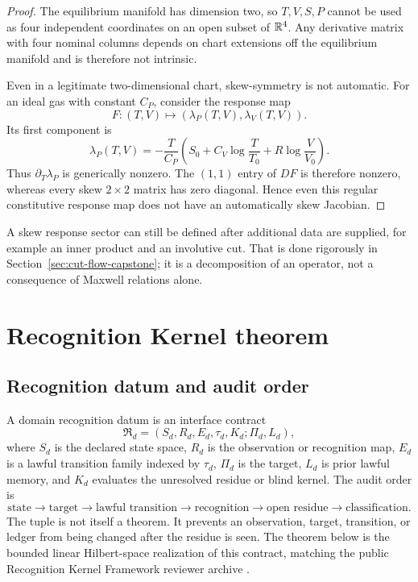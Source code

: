 \begin{proof}
The equilibrium manifold has dimension two, so $T,V,S,P$ cannot be used as four independent coordinates on an open subset of $\mathbb R^4$.  Any derivative matrix with four nominal columns depends on chart extensions off the equilibrium manifold and is therefore not intrinsic.

Even in a legitimate two-dimensional chart, skew-symmetry is not automatic.  For an ideal gas with constant $C_P$, consider the response map
\[
F:(T,V)\longmapsto(\lambda_P(T,V),\lambda_V(T,V)).
\]
Its first component is
\[
\lambda_P(T,V)=-\frac{T}{C_P}
\left(S_0+C_V\log\frac{T}{T_0}+R\log\frac{V}{V_0}\right).
\]
Thus $\partial_T\lambda_P$ is generically nonzero.  The $(1,1)$ entry of $DF$ is therefore nonzero, whereas every skew $2\times2$ matrix has zero diagonal.  Hence even this regular constitutive response map does not have an automatically skew Jacobian.
\end{proof}

A skew response sector can still be defined after additional data are supplied, for example an inner product and an involutive cut.  That is done rigorously in Section~\ref{sec:cut-flow-capstone}; it is a decomposition of an operator, not a consequence of Maxwell relations alone.

\section{Recognition Kernel theorem}
\label{sec:recognition-kernel}

\subsection{Recognition datum and audit order}

\begin{definition}
A domain recognition datum is an interface contract
\[
\mathfrak R_d=(S_d,R_d,E_d,\tau_d,K_d;\Pi_d,L_d),
\]
where $S_d$ is the declared state space, $R_d$ is the observation or recognition map, $E_d$ is a lawful transition family indexed by $\tau_d$, $\Pi_d$ is the target, $L_d$ is prior lawful memory, and $K_d$ evaluates the unresolved residue or blind kernel.  The audit order is
\[
\text{state}\to\text{target}\to\text{lawful transition}
\to\text{recognition}\to\text{open residue}
\to\text{classification}.
\]
The tuple is not itself a theorem.  It prevents an observation, target, transition, or ledger from being changed after the residue is seen.  The theorem below is the bounded linear Hilbert-space realization of this contract, matching the public Recognition Kernel Framework reviewer archive \cite{DabasRKF}.
\end{definition}

